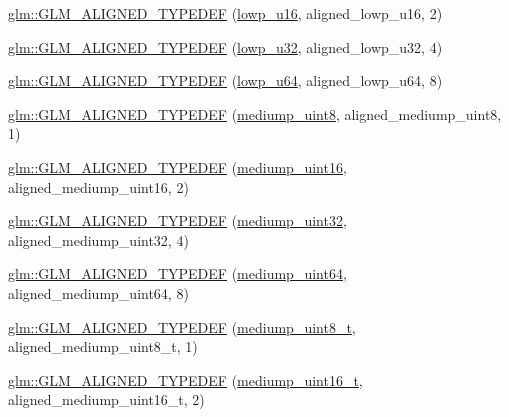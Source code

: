 \begin{DoxyCompactItemize}
\hyperlink{group__gtx__type__aligned_ga404bba7785130e0b1384d695a9450b28}{glm\+::\+G\+L\+M\+\_\+\+A\+L\+I\+G\+N\+E\+D\+\_\+\+T\+Y\+P\+E\+D\+EF} (\hyperlink{group__gtc__type__precision_ga22c5364f27caa0a6eb0627cbc21e46be}{lowp\+\_\+u16}, aligned\+\_\+lowp\+\_\+u16, 2)
\item 
\hyperlink{group__gtx__type__aligned_ga31ba41fd896257536958ec6080203d2a}{glm\+::\+G\+L\+M\+\_\+\+A\+L\+I\+G\+N\+E\+D\+\_\+\+T\+Y\+P\+E\+D\+EF} (\hyperlink{group__gtc__type__precision_gaba06fae1dd98ca50c017e68345df0365}{lowp\+\_\+u32}, aligned\+\_\+lowp\+\_\+u32, 4)
\item 
\hyperlink{group__gtx__type__aligned_gacca5f13627f57b3505676e40a6e43e5e}{glm\+::\+G\+L\+M\+\_\+\+A\+L\+I\+G\+N\+E\+D\+\_\+\+T\+Y\+P\+E\+D\+EF} (\hyperlink{group__gtc__type__precision_ga61ed4c68a4cffb77cd63cc107119123a}{lowp\+\_\+u64}, aligned\+\_\+lowp\+\_\+u64, 8)
\item 
\hyperlink{group__gtx__type__aligned_ga5faf1d3e70bf33174dd7f3d01d5b883b}{glm\+::\+G\+L\+M\+\_\+\+A\+L\+I\+G\+N\+E\+D\+\_\+\+T\+Y\+P\+E\+D\+EF} (\hyperlink{group__gtc__type__precision_gac4b849eaac0543a10f97f4bdda4850a8}{mediump\+\_\+uint8}, aligned\+\_\+mediump\+\_\+uint8, 1)
\item 
\hyperlink{group__gtx__type__aligned_ga727e2bf2c433bb3b0182605860a48363}{glm\+::\+G\+L\+M\+\_\+\+A\+L\+I\+G\+N\+E\+D\+\_\+\+T\+Y\+P\+E\+D\+EF} (\hyperlink{group__gtc__type__precision_ga2cef3a0d7b0fce75c9885f64656d8933}{mediump\+\_\+uint16}, aligned\+\_\+mediump\+\_\+uint16, 2)
\item 
\hyperlink{group__gtx__type__aligned_ga12566ca66d5962dadb4a5eb4c74e891e}{glm\+::\+G\+L\+M\+\_\+\+A\+L\+I\+G\+N\+E\+D\+\_\+\+T\+Y\+P\+E\+D\+EF} (\hyperlink{group__gtc__type__precision_ga861dbd1051f488e425b3966001b568e5}{mediump\+\_\+uint32}, aligned\+\_\+mediump\+\_\+uint32, 4)
\item 
\hyperlink{group__gtx__type__aligned_ga7b66a97a8acaa35c5a377b947318c6bc}{glm\+::\+G\+L\+M\+\_\+\+A\+L\+I\+G\+N\+E\+D\+\_\+\+T\+Y\+P\+E\+D\+EF} (\hyperlink{group__gtc__type__precision_ga6685788d15d0a973ee7c2460d0456dc1}{mediump\+\_\+uint64}, aligned\+\_\+mediump\+\_\+uint64, 8)
\item 
\hyperlink{group__gtx__type__aligned_gaa9cde002439b74fa66120a16a9f55fcc}{glm\+::\+G\+L\+M\+\_\+\+A\+L\+I\+G\+N\+E\+D\+\_\+\+T\+Y\+P\+E\+D\+EF} (\hyperlink{group__gtc__type__precision_gadfa38f3c245d371c4b2079f1fd68928b}{mediump\+\_\+uint8\+\_\+t}, aligned\+\_\+mediump\+\_\+uint8\+\_\+t, 1)
\item 
\hyperlink{group__gtx__type__aligned_ga1ca98c67f7d1e975f7c5202f1da1df1f}{glm\+::\+G\+L\+M\+\_\+\+A\+L\+I\+G\+N\+E\+D\+\_\+\+T\+Y\+P\+E\+D\+EF} (\hyperlink{group__gtc__type__precision_ga0b385466deac5ac96061ef2cdd6db20f}{mediump\+\_\+uint16\+\_\+t}, aligned\+\_\+mediump\+\_\+uint16\+\_\+t, 2)

\end{DoxyCompactItemize}
